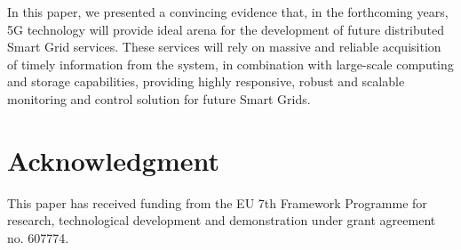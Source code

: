 \documentclass[journal]{IEEEtran}
\begin{document}

In this paper, we presented a convincing evidence that, in the forthcoming years, 5G technology will provide ideal arena for the development of future distributed Smart Grid services. These services will rely on massive and reliable acquisition of timely information from the system, in combination with large-scale computing and storage capabilities, providing highly responsive, robust and scalable monitoring and control solution for future Smart Grids.   

\section*{Acknowledgment}
This paper has received funding from the EU 7th Framework Programme for research, technological development and demonstration under grant agreement no. 607774.






\end{document}
